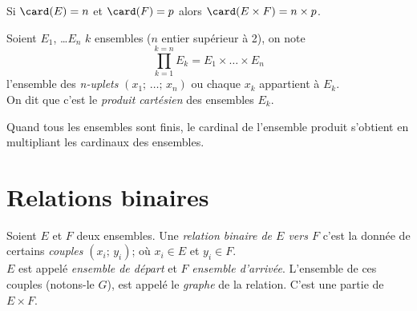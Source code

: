 \documentclass[a4paper,12pt,french]{book}
\begin{document}
\begin{propriete}[]
Si $\card(E)=n$ et $\card(F)=p$ alors $\card(E\times F)=n\times p$.
\end{propriete}

\begin{definition}
Soient $E_1$, \ldots $E_n$ $k$ ensembles ($n$ entier supérieur à 2), on note
$$\prod_{k=1}^{k=n}E_k=E_1\times\ldots\times E_n$$
l'ensemble des \textit{n-uplets} $(x_1;\,\ldots;\,x_n)$ ou chaque $x_k$ appartient à $E_k$.\\ On dit que c'est le \textit{produit cartésien} des ensembles $E_k$.
\end{definition}

\begin{propriete}[]
Quand tous les ensembles sont finis, le cardinal de l'ensemble produit s'obtient en multipliant les cardinaux des ensembles.
\end{propriete}
\section{Relations binaires}
\begin{definition}
Soient $E$ et $F$ deux ensembles. Une \textit{relation binaire de $E$ vers $F$} c'est la donnée de certains \textit{couples} $(x_i;\,y_i)$; où $x_i\in E$ et $y_i\in F$.\\
$E$ est appelé \textit{ensemble de départ} et $F$ \textit{ensemble d'arrivée}.
L'ensemble de ces couples (notons-le $G$), est appelé le \textit{graphe} de la relation. C'est une partie de $E\times F$.
\end{definition}
\end{document}
